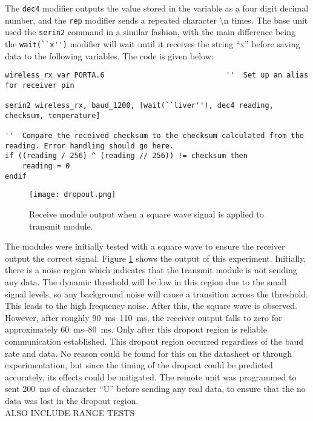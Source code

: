 The \verb|dec4| modifier outputs the value stored in the variable as a four digit decimal number, and the \verb|rep| modifier sends a repeated character \textbackslash n times. The base unit used the \verb|serin2| command in a similar fashion, with the main difference being the \verb|wait(``x'')| modifier will wait until it receives the string ``x'' before saving data to the following variables. The code is given below:

\begin{lstlisting}
wireless_rx var PORTA.6                            ''  Set up an alias for receiver pin

serin2 wireless_rx, baud_1200, [wait(``liver''), dec4 reading, checksum, temperature]

''  Compare the received checksum to the checksum calculated from the reading. Error handling should go here.
if ((reading / 256) ^ (reading // 256)) != checksum then
    reading = 0
endif
\end{lstlisting}






\begin{figure}[htbp]
	\centering
	\texttt{[image: dropout.png]}
	\caption{Receive module output when a square wave signal is applied to transmit module.}
	\label{fig: dropout}
\end{figure}

The modules were initially tested with a square wave to ensure the receiver output the correct signal. Figure \ref{fig: dropout} shows the output of this experiment. Initially, there is a noise region which indicates that the transmit module is not sending any data. The dynamic threshold will be low in this region due to the small signal levels, so any background noise will cause a transition across the threshold. This leads to the high frequency noise. After this, the square wave is observed. However, after roughly \SIrange{90}{110}{\milli\second}, the receiver output falls to zero for approximately \SIrange{60}{80}{\milli\second}. Only after this dropout region is reliable communication established. This dropout region occurred regardless of the baud rate and data. No reason could be found for this on the datasheet or through experimentation, but since the timing of the dropout could be predicted accurately, its effects could be mitigated. The remote unit was programmed to sent \SI{200}{\milli\second} of character ``U'' before sending any real data, to ensure that the no data was lost in the dropout region.\\

ALSO INCLUDE RANGE TESTS\\








